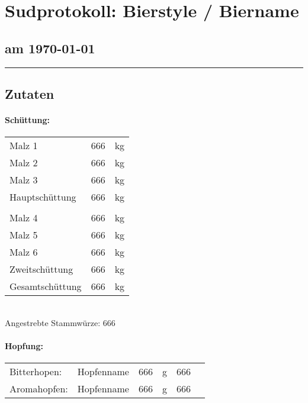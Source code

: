 \documentclass[12pt,oneside,a4paper]{scrartcl}
\begin{document}
	\begin{minipage}[c]{0.70\textwidth}
		\section*{\hspace{-.4cm}Sudprotokoll: Bierstyle / Biername}
	\end{minipage}
	\begin{minipage}[c]{0.29\textwidth}
		\subsection*{am \today}
	\end{minipage}
	\rule{\textwidth}{1pt}
%
\subsection*{Zutaten}
%
\paragraph{Schüttung:}
	\begin{tabular}[t]{m{8cm} m{2cm} m{1cm}}
		Malz 1 & \num{666} & \si{\kilogram}\bigstrut\\
		Malz 2 & \num{666} & \si{\kilogram}\bigstrut\\
		Malz 3 & \num{666} & \si{\kilogram} \bigstrut\\ \hline
		Hauptschüttung & \num{666} & \si{\kilogram}\bigstrut\\
		&&\\
		Malz 4 & \num{666} & \si{\kilogram}\bigstrut\\
		Malz 5 & \num{666} & \si{\kilogram}\bigstrut\\
		Malz 6 & \num{666} & \si{\kilogram} \bigstrut\\ \hline
		Zweitschüttung & \num{666} & \si{\kilogram}\bigstrut\\\hline\hline
		Gesamtschüttung & \num{666} & \si{\kilogram}\bigstrut
	\end{tabular}\\

\vspace{.25cm}
\hspace{1cm}Angestrebte Stammwürze: \SI{666}{\plato}
%
\paragraph{Hopfung:}
	\begin{tabular}[t]{m{2.5cm} m{5cm} m{0.8cm} m{1cm} m{0.8cm} m{1cm}}
		Bitterhopen: & Hopfenname & \num{666} & \si{\gram} & \num{666} & \si{\alfa} \\
		Aromahopfen: & Hopfenname & \num{666} & \si{\gram} & \num{666} & \si{\alfa}
	\end{tabular}\\
\end{document}
